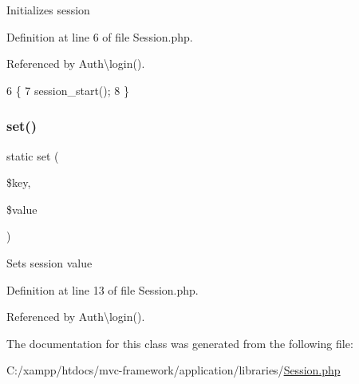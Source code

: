 Initializes session 

Definition at line 6 of file Session.\+php.



Referenced by Auth\textbackslash{}login().


\begin{DoxyCode}
6                                   \{
7         session\_start();
8     \}
\end{DoxyCode}
\hypertarget{class_session_aa485369b2925858d92e468d405bd0798}{}\label{class_session_aa485369b2925858d92e468d405bd0798} 
\subsubsection{\texorpdfstring{set()}{set()}}
{\footnotesize\ttfamily static set (\begin{DoxyParamCaption}\item[{}]{\$key,  }\item[{}]{\$value }\end{DoxyParamCaption})\hspace{0.3cm}{\ttfamily [static]}}

Sets session value 

Definition at line 13 of file Session.\+php.



Referenced by Auth\textbackslash{}login().




The documentation for this class was generated from the following file\+:\begin{DoxyCompactItemize}
\item 
C\+:/xampp/htdocs/mvc-\/framework/application/libraries/\hyperlink{_session_8php}{Session.\+php}\end{DoxyCompactItemize}
